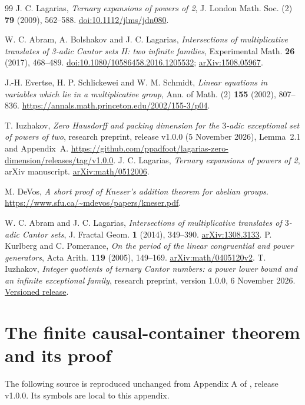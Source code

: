 \documentclass[11pt]{article}
\theoremstyle{definition}
\theoremstyle{remark}
\begin{document}
\begin{thebibliography}{99}
J. C. Lagarias,
\emph{Ternary expansions of powers of 2},
J. London Math. Soc. (2) \textbf{79} (2009), 562--588.
\href{https://doi.org/10.1112/jlms/jdn080}{doi:10.1112/jlms/jdn080}.

W. C. Abram, A. Bolshakov and J. C. Lagarias,
\emph{Intersections of multiplicative translates of 3-adic Cantor sets II:
two infinite families},
Experimental Math. \textbf{26} (2017), 468--489.
\href{https://doi.org/10.1080/10586458.2016.1205532}
{doi:10.1080/10586458.2016.1205532};
\href{https://arxiv.org/abs/1508.05967}{arXiv:1508.05967}.

J.-H. Evertse, H. P. Schlickewei and W. M. Schmidt,
\emph{Linear equations in variables which lie in a multiplicative group},
Ann. of Math. (2) \textbf{155} (2002), 807--836.
\url{https://annals.math.princeton.edu/2002/155-3/p04}.

T. Iuzhakov,
\emph{Zero Hausdorff and packing dimension for the
$3$-adic exceptional set of powers of two},
research preprint, release v1.0.0 (5 November 2026), Lemma~2.1 and Appendix~A.
\url{https://github.com/ppadfoot/lagarias-zero-dimension/releases/tag/v1.0.0}.
J. C. Lagarias,
\emph{Ternary expansions of powers of 2}, arXiv manuscript.
\href{https://arxiv.org/abs/math/0512006}{arXiv:math/0512006}.

M. DeVos,
\emph{A short proof of Kneser's addition theorem for abelian groups}.
\url{https://www.sfu.ca/~mdevos/papers/kneser.pdf}.

W. C. Abram and J. C. Lagarias,
\emph{Intersections of multiplicative translates of $3$-adic Cantor sets},
J. Fractal Geom. \textbf{1} (2014), 349--390.
\href{https://arxiv.org/abs/1308.3133}{arXiv:1308.3133}.
P. Kurlberg and C. Pomerance,
\emph{On the period of the linear congruential and power generators},
Acta Arith. \textbf{119} (2005), 149--169.
\href{https://arxiv.org/abs/math/0405120}{arXiv:math/0405120v2}.
T. Iuzhakov, \emph{Integer quotients of ternary Cantor numbers:
a power lower bound and an infinite exceptional family}, research
preprint, version 1.0.0, 6 November 2026.
\href{https://github.com/ppadfoot/ternary-cantor-quotients/releases/tag/v1.0.0}{Versioned release}.
\end{thebibliography}
\appendix
\section{The finite causal-container theorem and its proof}
\label{app:container}
The following source is reproduced unchanged from Appendix A of
\cite{Core}, release v1.0.0. Its symbols are local to this appendix.

\end{document}
